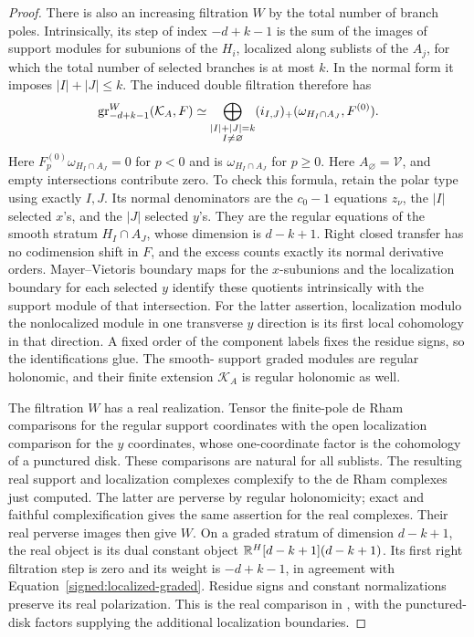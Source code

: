 \begin{proof}
There is also an increasing filtration \(W\) by the total
number of branch poles.  Intrinsically, its step of index
\(-d+k-1\) is the sum of the images of support modules for
subunions of the \(H_i\), localized along sublists of the
\(A_j\), for which the total number of selected branches is
at most \(k\).  In the normal form it imposes
\(|I|+|J|\leq k\).  The induced double filtration therefore
has
\begin{equation}\label{signed:localized-graded}
 \operatorname{gr}^W_{-d+k-1}(\mathcal K_A,F)
 \simeq
 \bigoplus_{\substack{|I|+|J|=k\\ I\ne\varnothing}}
 (i_{I,J})_+(\omega_{H_I\cap A_J},F^{(0)}).
\end{equation}
Here \(F^{(0)}_p\omega_{H_I\cap A_J}=0\) for \(p<0\) and is
\(\omega_{H_I\cap A_J}\) for \(p\geq0\).
Here \(A_\varnothing=\mathscr V\), and empty intersections
contribute zero.  To check this formula, retain the polar type
using exactly \(I,J\).  Its normal denominators are the
\(c_0-1\) equations \(z_\nu\), the \(|I|\) selected \(x\)'s,
and the \(|J|\) selected \(y\)'s.  They are the regular
equations of the smooth stratum \(H_I\cap A_J\), whose
dimension is \(d-k+1\).  Right closed transfer has no
codimension shift in \(F\), and the excess counts exactly its
normal derivative orders.  Mayer--Vietoris boundary maps for
the \(x\)-subunions and the localization boundary for each
selected \(y\) identify these quotients intrinsically with
the support module of that intersection.  For the latter
assertion, localization modulo the nonlocalized module in one
transverse \(y\) direction is its first local cohomology in
that direction.  A fixed order of the component labels fixes
the residue signs, so the identifications glue.  The smooth-
support graded modules are regular holonomic, and their finite
extension \(\mathcal K_A\) is regular holonomic as well.

The filtration \(W\) has a real realization.  Tensor the
finite-pole de Rham comparisons for the regular support
coordinates with the open localization comparison for the
\(y\) coordinates, whose one-coordinate factor is the
cohomology of a punctured disk.  These comparisons are
natural for all sublists.  The resulting real support and
localization complexes complexify to the de Rham complexes
just computed.  The latter are perverse by regular
holonomicity; exact and faithful complexification gives the
same assertion for the real complexes.  Their real perverse
images then give \(W\).
On a graded stratum of dimension \(d-k+1\), the real object
is its dual constant object
\(\mathbb R^H[d-k+1](d-k+1)\).  Its first right filtration step is
zero and its weight is \(-d+k-1\), in agreement with
Equation~\eqref{signed:localized-graded}.  Residue signs and
constant normalizations preserve its real polarization.  This
is the real comparison in \cite[Section~11.2]{BL}, with the
punctured-disk factors supplying the additional localization
boundaries.


\end{proof}
